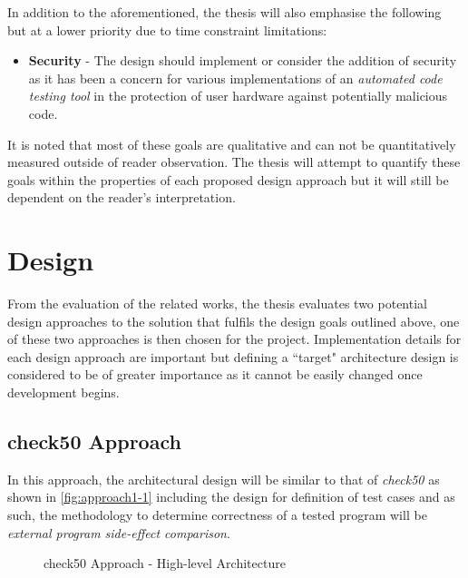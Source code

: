 \documentclass[hidelinks, 12pt]{extreport}
\begin{document}
In addition to the aforementioned, the thesis will also emphasise the following but at a lower priority due to time constraint limitations:

\begin{itemize}
	\item \textbf{Security} - The design should implement or consider the addition of security as it has been a concern for various implementations of an \textit{automated code testing tool} in the protection of user hardware against potentially malicious code.
\end{itemize}

It is noted that most of these goals are qualitative and can not be quantitatively measured outside of reader observation. The thesis will attempt to quantify these goals within the properties of each proposed design approach but it will still be dependent on the reader's interpretation.

\section{Design}

From the evaluation of the related works, the thesis evaluates two potential design approaches to the solution that fulfils the design goals outlined above, one of these two approaches is then chosen for the project. Implementation details for each design approach are important but defining a ``target" architecture design is considered to be of greater importance as it cannot be easily changed once development begins.

\subsection{check50 Approach}

In this approach, the architectural design will be similar to that of \textit{check50} as shown in \autoref{fig:approach1-1} including the design for definition of test cases and as such, the methodology to determine correctness of a tested program will be \textit{external program side-effect comparison}.

\begin{figure}[h]
	\centering
	\caption{check50 Approach - High-level Architecture}
	\label{fig:approach1-1}
\end{figure}
\end{document}
